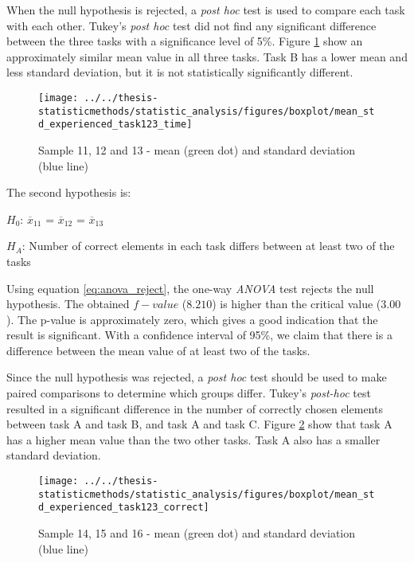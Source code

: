 When the null hypothesis is rejected, a \textit{post hoc} test is used to compare each task with each other. Tukey's \textit{post hoc} test did not find any significant difference between the three tasks with a significance level of 5\%. Figure \ref{fig:meanstdexperiencedtask123time} show an approximately similar mean value in all three tasks. Task B has a lower mean and less standard deviation, but it is not statistically significantly different.

\begin{figure}[H]
	\centering
	\texttt{[image: ../../thesis-statisticmethods/statistic\_analysis/figures/boxplot/mean\_std\_experienced\_task123\_time]}
	\caption{Sample 11, 12 and 13 - mean (green dot) and standard deviation (blue line)}
	\label{fig:meanstdexperiencedtask123time}
\end{figure}


The second hypothesis is:\\
\centerline{$H_{0}$: $\overline{x}_11$ = $\overline{x}_12$ = $\overline{x}_13$}
\centerline{$H_{A}$: Number of correct elements in each task differs between at least two of the tasks}
\vspace{0.2cm}

Using equation \ref{eq:anova_reject}, the one-way \textit{ANOVA} test rejects the null hypothesis. The obtained $f-value$ ($8.210$) is higher than the critical value ($3.00$). The p-value is approximately zero, which gives a good indication that the result is significant. With a confidence interval of 95\%, we claim that there is a difference between the mean value of at least two of the tasks. 

Since the null hypothesis was rejected, a \textit{post hoc} test should be used to make paired comparisons to determine which groups differ. Tukey's \textit{post-hoc} test resulted in a significant difference in the number of correctly chosen elements between task A and task B, and task A and task C. Figure \ref{fig:meanstdexperiencedtask123correct} show that task A has a higher mean value than the two other tasks. Task A also has a smaller standard deviation. 

\begin{figure}[H]
	\centering
	\texttt{[image: ../../thesis-statisticmethods/statistic\_analysis/figures/boxplot/mean\_std\_experienced\_task123\_correct]}
	\caption{Sample 14, 15 and 16 - mean (green dot) and standard deviation (blue line)}
	\label{fig:meanstdexperiencedtask123correct}
\end{figure}


